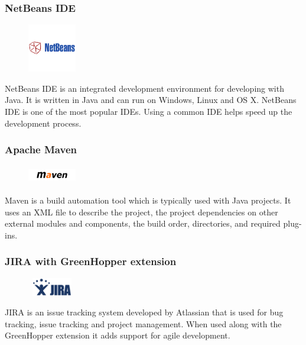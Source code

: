 \subsubsection{NetBeans IDE}
\begin{figure}
  \vspace{-50pt}
  \begin{center}
    \includegraphics[width=80px, height=80px]{NetBeans}
  \end{center}

\end{figure}
NetBeans IDE is an integrated development environment for developing with Java. It is written in Java and can run on Windows, Linux and OS X. NetBeans IDE is one of the most popular IDEs. Using a common IDE helps speed up the development process.

\subsubsection{Apache Maven}
\begin{figure}
  \vspace{-100pt}
  \begin{center}
    \includegraphics[width=80px,height=30px]{Maven}
  \end{center}

\end{figure}
Maven is a build automation tool which is typically used with Java projects. It uses an XML file to describe the project, the project dependencies on other external modules and components, the build order, directories, and required plug-ins.   

\subsubsection{JIRA with GreenHopper extension}
\begin{figure}
  \vspace{-40pt}
  \begin{center}
    \includegraphics[width=80px,height=30px]{Jira}
  \end{center}

\end{figure}
JIRA is an issue tracking system developed by Atlassian that is used for bug tracking, issue tracking and project management. When used along with the GreenHopper extension it adds support for agile development.

